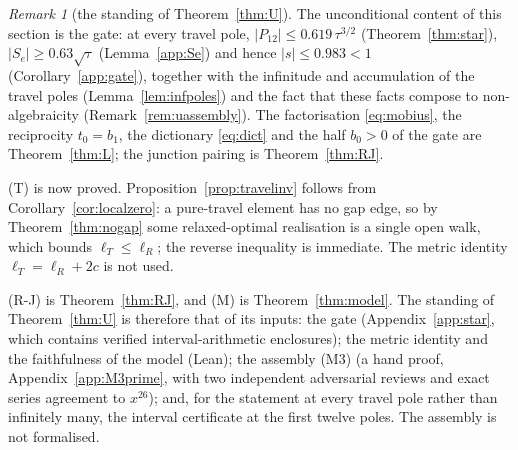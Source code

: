 \documentclass[11pt]{article}
\theoremstyle{plain}
\theoremstyle{definition}
\theoremstyle{remark}
\newtheorem{remark}[theorem]{Remark}
\begin{document}
\begin{remark}[the standing of Theorem~\ref{thm:U}]\label{rem:Ustatus}
The unconditional content of this section is the gate: at every travel pole,
$|P_{12}|\le0.619\,\tau^{3/2}$ (Theorem~\ref{thm:star}), $|S_e|\ge0.63\sqrt\tau$
(Lemma~\ref{app:Se}) and hence $|s|\le0.983<1$ (Corollary~\ref{app:gate}), together with the
infinitude and accumulation of the travel poles (Lemma~\ref{lem:infpoles}) and the fact that these
facts compose to non-algebraicity (Remark~\ref{rem:uassembly}).
The factorisation \eqref{eq:mobius}, the reciprocity $t_0=b_1$, the dictionary \eqref{eq:dict} and
the half $b_0>0$ of the gate are Theorem~\ref{thm:L}; the junction pairing is Theorem~\ref{thm:RJ}.

\textup{(T)} is now proved. Proposition~\ref{prop:travelinv} follows from
Corollary~\ref{cor:localzero}: a pure-travel element has no gap edge, so by
Theorem~\ref{thm:nogap} some relaxed-optimal realisation is a single open walk, which bounds
$\ell_T\le\ell_R$; the reverse inequality is immediate. The metric identity
$\ell_T=\ell_R+2c$ is not used.

\textup{(R-J)} is Theorem~\ref{thm:RJ}, and \textup{(M)} is Theorem~\ref{thm:model}. The standing of
Theorem~\ref{thm:U} is therefore that of its inputs: the gate (Appendix~\ref{app:star}, which
contains verified interval-arithmetic enclosures); the metric identity and the faithfulness of the
model (Lean); the assembly \textup{(M3)} (a hand proof, Appendix~\ref{app:M3prime}, with two
independent adversarial reviews and exact series agreement to $x^{26}$); and, for the statement at
every travel pole rather than infinitely many, the interval certificate at the first twelve poles.
The assembly is not formalised.
\end{remark}
\end{document}
